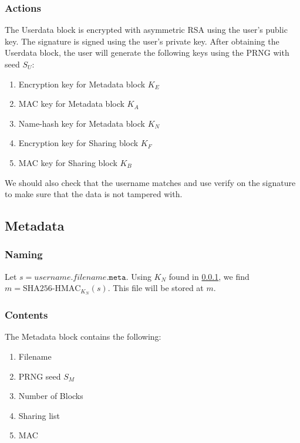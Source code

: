 \documentclass{article}
\begin{document}
\subsubsection{Actions}
\label{sssec:userdata_actions}
The Userdata block is encrypted with asymmetric RSA using the user's public key.
The signature is signed using the user's private key.
After obtaining the Userdata block, the user will generate the following keys using the PRNG with seed $S_U$:
\begin{enumerate}
\item Encryption key for Metadata block $K_E$
\item MAC key for Metadata block $K_A$
\item Name-hash key for Metadata block $K_N$
\item Encryption key for Sharing block $K_F$
\item MAC key for Sharing block $K_B$
\end{enumerate}
We should also check that the username matches and use verify on the signature to make sure that the data is
not tampered with.

\subsection{Metadata}
\subsubsection{Naming}
Let $s = username\texttt{.}filename\texttt{.meta}$.
Using $K_N$ found in \ref{sssec:userdata_actions}, we find $m = \text{SHA256-HMAC}_{K_N}(s)$.
This file will be stored at $m$.

\subsubsection{Contents}
The Metadata block contains the following:
\begin{enumerate}
\item Filename
\item PRNG seed $S_M$
\item Number of Blocks
\item Sharing list
\item MAC
\end{enumerate}
\end{document}
